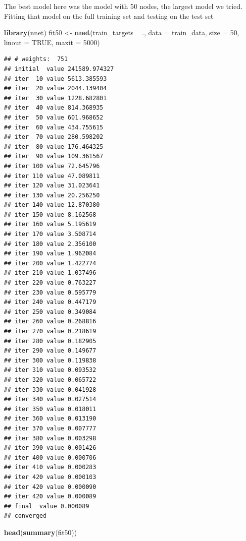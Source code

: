 \documentclass[10pt,ignorenonframetext,]{beamer}
\newenvironment{Shaded}{\begin{snugshade}}{\end{snugshade}}
\newcommand{\DataTypeTok}[1]{\textcolor[rgb]{0.13,0.29,0.53}{#1}}
\newcommand{\DecValTok}[1]{\textcolor[rgb]{0.00,0.00,0.81}{#1}}
\newcommand{\KeywordTok}[1]{\textcolor[rgb]{0.13,0.29,0.53}{\textbf{#1}}}
\newcommand{\NormalTok}[1]{#1}
\newcommand{\OperatorTok}[1]{\textcolor[rgb]{0.81,0.36,0.00}{\textbf{#1}}}
\newcommand{\OtherTok}[1]{\textcolor[rgb]{0.56,0.35,0.01}{#1}}
\newcommand{\StringTok}[1]{\textcolor[rgb]{0.31,0.60,0.02}{#1}}
\begin{document}
\begin{frame}[fragile]

The best model here was the model with 50 nodes, the largest model we
tried. Fitting that model on the full training set and testing on the
test set

\scriptsize

\begin{Shaded}
\begin{Highlighting}[]
\KeywordTok{library}\NormalTok{(nnet)}
\NormalTok{fit50 <-}\StringTok{ }\KeywordTok{nnet}\NormalTok{(train_targets }\OperatorTok{~}\StringTok{ }\NormalTok{., }\DataTypeTok{data =}\NormalTok{ train_data, }\DataTypeTok{size =} \DecValTok{50}\NormalTok{, }\DataTypeTok{linout =} \OtherTok{TRUE}\NormalTok{, }
    \DataTypeTok{maxit =} \DecValTok{5000}\NormalTok{)}
\end{Highlighting}
\end{Shaded}

\begin{verbatim}
## # weights:  751
## initial  value 241589.974327 
## iter  10 value 5613.385593
## iter  20 value 2044.139404
## iter  30 value 1228.682801
## iter  40 value 814.368935
## iter  50 value 601.968652
## iter  60 value 434.755615
## iter  70 value 280.598202
## iter  80 value 176.464325
## iter  90 value 109.361567
## iter 100 value 72.645796
## iter 110 value 47.089811
## iter 120 value 31.023641
## iter 130 value 20.256250
## iter 140 value 12.870380
## iter 150 value 8.162568
## iter 160 value 5.195619
## iter 170 value 3.508714
## iter 180 value 2.356100
## iter 190 value 1.962084
## iter 200 value 1.422774
## iter 210 value 1.037496
## iter 220 value 0.763227
## iter 230 value 0.595779
## iter 240 value 0.447179
## iter 250 value 0.349084
## iter 260 value 0.268816
## iter 270 value 0.218619
## iter 280 value 0.182905
## iter 290 value 0.149677
## iter 300 value 0.119838
## iter 310 value 0.093532
## iter 320 value 0.065722
## iter 330 value 0.041928
## iter 340 value 0.027514
## iter 350 value 0.018011
## iter 360 value 0.013190
## iter 370 value 0.007777
## iter 380 value 0.003298
## iter 390 value 0.001426
## iter 400 value 0.000706
## iter 410 value 0.000283
## iter 420 value 0.000103
## iter 420 value 0.000090
## iter 420 value 0.000089
## final  value 0.000089 
## converged
\end{verbatim}

\begin{Shaded}
\begin{Highlighting}[]
\KeywordTok{head}\NormalTok{(}\KeywordTok{summary}\NormalTok{(fit50))}
\end{Highlighting}
\end{Shaded}


\end{frame}
\end{document}
